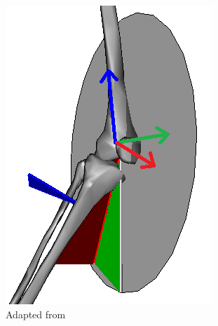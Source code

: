\documentclass[../main.tex]{subfiles}
\begin{document}
\begin{figure}[!htb]
\begin{subfigure}[t]{0.3\textwidth}
        \includegraphics[width=\textwidth]{img/KneeJointAngles_wCoord_twisted.png}
        \caption{Adapted from \cite{cgm-outputs}}
        \label{fig:cgm23-knee-coordinate-system}
    \end{subfigure}
     ~
    \begin{subfigure}[t]{0.3\textwidth}
        \centering

\end{subfigure}
\end{figure}
\end{document}
